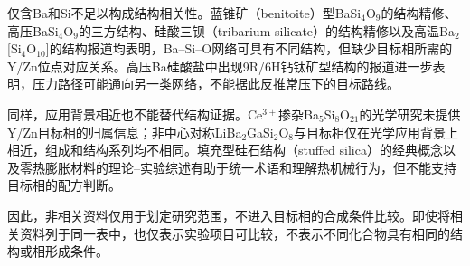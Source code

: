 仅含Ba和Si不足以构成结构相关性。蓝锥矿（benitoite）型BaSi$_4$O$_9$的结构精修\cite{finger1995refinement}、高压BaSi$_4$O$_9$的三方结构\cite{hazen1999crystal}、硅酸三钡（tribarium silicate）的结构精修\cite{tillmanns1978refinement}以及高温Ba$_2$[Si$_4$O$_{10}$]的结构报道\cite{katscher1973the}均表明，Ba--Si--O网络可具有不同结构，但缺少目标相所需的Y\slash Zn位点对应关系。高压Ba硅酸盐中出现9R/6H钙钛矿型结构的报道进一步表明，压力路径可能通向另一类网络，不能据此反推常压下的目标路线\cite{yusa2007rhombohedral}。

同样，应用背景相近也不能替代结构证据。Ce$^{3+}$掺杂Ba$_5$Si$_8$O$_{21}$的光学研究未提供Y\slash Zn目标相的归属信息\cite{zhong2020combining}；非中心对称LiBa$_2$GaSi$_2$O$_8$与目标相仅在光学应用背景上相近，组成和结构系列均不相同\cite{gu2025liba2gasi2o8}。填充型硅石结构（stuffed silica）的经典概念以及零热膨胀材料的理论--实验综述有助于统一术语和理解热机械行为，但不能支持目标相的配方判断\cite{buerger1954the,erlebach2020thermomechanical}。

因此，非相关资料仅用于划定研究范围，不进入目标相的合成条件比较。即使将相关资料列于同一表中，也仅表示实验项目可比较，不表示不同化合物具有相同的结构或相形成条件。
